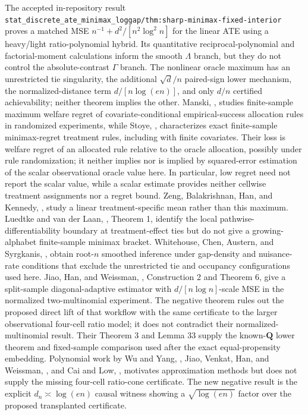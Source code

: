 \documentclass{article}
\begin{document}
The accepted in-repository result \texttt{stat\_discrete\_ate\_minimax\_loggap/thm:sharp-minimax-fixed-interior} proves a matched MSE \(n^{-1}+d^2/[n^2\log^2 n]\) for the linear ATE using a heavy/light ratio-polynomial hybrid. Its quantitative reciprocal-polynomial and factorial-moment calculations inform the smooth \(\Lambda\) branch, but they do not control the absolute-contrast \(\Gamma\) branch. The nonlinear oracle maximum has an unrestricted tie singularity, the additional \(\sqrt d/n\) paired-sign lower mechanism, the normalized-distance term \(d/[n\log(en)]\), and only \(d/n\) certified achievability; neither theorem implies the other. Manski, \cite{Manski2004}, studies finite-sample maximum welfare regret of covariate-conditional empirical-success allocation rules in randomized experiments, while Stoye, \cite{Stoye2009}, characterizes exact finite-sample minimax-regret treatment rules, including with finite covariates. Their loss is welfare regret of an allocated rule relative to the oracle allocation, possibly under rule randomization; it neither implies nor is implied by squared-error estimation of the scalar observational oracle value here. In particular, low regret need not report the scalar value, while a scalar estimate provides neither cellwise treatment assignments nor a regret bound. Zeng, Balakrishnan, Han, and Kennedy, \cite{ZengBalakrishnanHanKennedy2024Discrete}, study a linear treatment-specific mean rather than this maximum. Luedtke and van der Laan, \cite{LuedtkeVanderLaan2016OptimalValue}, Theorem 1, identify the local pathwise-differentiability boundary at treatment-effect ties but do not give a growing-alphabet finite-sample minimax bracket. Whitehouse, Chen, Austern, and Syrgkanis, \cite{WhitehouseChenAusternSyrgkanis2025}, obtain root-\(n\) smoothed inference under gap-density and nuisance-rate conditions that exclude the unrestricted tie and occupancy configurations used here. Jiao, Han, and Weissman, \cite{JiaoHanWeissman2018L1}, Construction 2 and Theorem 6, give a split-sample diagonal-adaptive estimator with \(d/[n\log n]\)-scale MSE in the normalized two-multinomial experiment. The negative theorem rules out the proposed direct lift of that workflow with the same certificate to the larger observational four-cell ratio model; it does not contradict their normalized-multinomial result. Their Theorem 3 and Lemma 33 supply the known-\(\mathbf Q\) lower theorem and fixed-sample comparison used after the exact equal-propensity embedding. Polynomial work by Wu and Yang, \cite{WuYang2016Entropy}, Jiao, Venkat, Han, and Weissman, \cite{JiaoVenkatHanWeissman2015Functionals}, and Cai and Low, \cite{CaiLow2011L1}, motivates approximation methods but does not supply the missing four-cell ratio-cone certificate. The new negative result is the explicit \(d_n\asymp\log(en)\) causal witness showing a \(\sqrt{\log(en)}\) factor over the proposed transplanted certificate.
\end{document}
